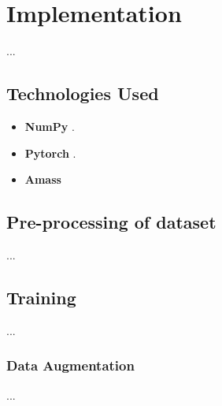 \chapter{Implementation}
\label{chap:Implementation}
...
\section{Technologies Used}
\begin{itemize}
\item\textbf{NumPy} \cite{NumPy}.
\item\textbf{Pytorch} \cite{PyTorch}.
\item\textbf{Amass} \cite{AMASS:ICCV:2019}
\end{itemize}

\section{Pre-processing of dataset}
...

\section{Training}
... 

\subsection{Data Augmentation}
...